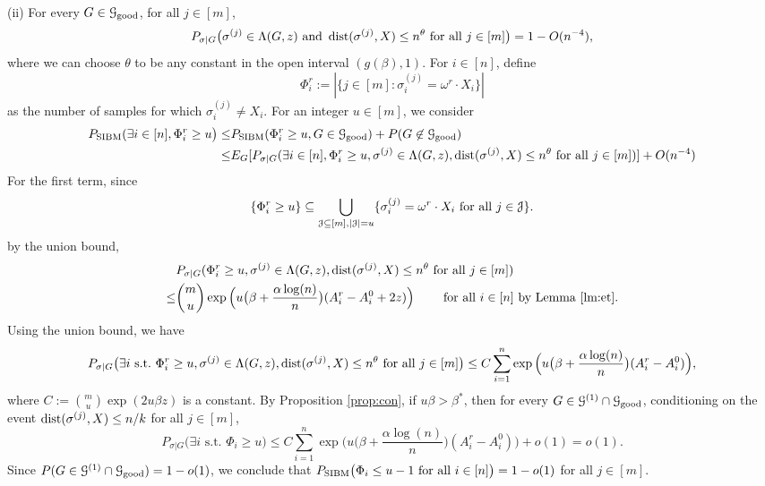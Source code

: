 \documentclass{article}
\begin{document}
\noindent (ii) For every $G\in\mathcal{G}_{\operatorname{good}}$, for all $j\in[m]$,
\begin{equation}  \label{eq:chui}
P_{\sigma|G} \big( \sigma^{(j)}\in  \Lambda(G, z)
\text{~and~} \operatorname{dist}(\sigma^{(j)}, X) \le n^\theta
\text{~for all~} j\in[m]  \big)
=1- O(n^{-4}) ,
\end{equation}
where we can choose $\theta$ to be any constant in the open interval $(g(\beta), 1)$.
For $i\in[n]$, define 
$$
\Phi^r_i := |\{j\in[m]: \sigma_i^{(j)} = \omega^r \cdot X_i\}|
$$
as the number of samples for which $\sigma_i^{(j)} \neq X_i$.
For an integer $u\in[m]$, we consider
\begin{align*}
P_{\operatorname{SIBM}}( \exists i \in [n], \Phi^r_i \ge u \big) \leq &P_{\operatorname{SIBM}}( \Phi^r_i \ge u , G \in \mathcal{G}_{\operatorname{good}}) + P(G \not\in \mathcal{G}_{\operatorname{good}}) \\
\leq & E_G[P_{\sigma |G}(\exists i \in [n], \Phi^r_i \ge u, \sigma^{(j)}\in \Lambda(G,z) ,\operatorname{dist}(\sigma^{(j)}, X) \le n^{\theta} \text{~for all~} j\in[m])]+ O(n^{-4})
\end{align*}
For the first term, since
$$
\{\Phi^r_i \ge u\} \subseteq
\bigcup_{\mathcal{J}\subseteq[m], |\mathcal{J}|=u}
\{\sigma_i^{(j)} = \omega^r \cdot X_i \text{~for all~} j\in \mathcal{J}\} .
$$
by the union bound,
\begin{align*}
& P_{\sigma|G}( \Phi^r_i \ge u, \sigma^{(j)}\in \Lambda(G,z) ,\operatorname{dist}(\sigma^{(j)}, X) \le n^{\theta} \text{~for all~} j\in[m] ) \\
\le &  \binom{m}{u} \exp\Big(u\big(\beta+\frac{\alpha\log(n)}{n} \big) (A^r_i-A^0_i + 2z) \Big)
\quad\quad\text{~for all~} i\in[n] \textrm{ by Lemma~\ref{lm:et}}.
\end{align*}
Using the union bound, we have
$$
P_{\sigma|G} \big(\exists i \text{~s.t.~} \Phi^r_i \ge u, \sigma^{(j)}\in \Lambda(G,z) ,\operatorname{dist}(\sigma^{(j)}, X) \le n^{\theta} \text{~for all~} j\in[m] \big) \le 
C  \sum_{i=1}^n \exp\Big(u \big(\beta+\frac{\alpha\log(n)}{n} \big) (A^r_i-A^0_i ) \Big),
$$
where $C:=\binom{m}{u}\exp(2u\beta z)$ is a constant.
By Proposition \ref{prop:con}, if $u\beta>\beta^*$, then for every $G\in\mathcal{G}^{(1)}\cap\mathcal{G}_{\operatorname{good}}$, conditioning on the event $\operatorname{dist}(\sigma^{(j)}, X) \le n/k$ for all $j\in[m]$,
$$
P_{\sigma|G} \big(\exists i \text{~s.t.~} \Phi_i \ge u \big) \le 
C\sum_{i=1}^n \exp\Big(u \big(\beta+\frac{\alpha\log(n)}{n} \big) (A^r_i-A^0_i ) \Big) + o(1) =o(1).
$$
Since $P(G\in\mathcal{G}^{(1)}\cap\mathcal{G}_{\operatorname{good}})=1-o(1)$, we conclude that $P_{\operatorname{SIBM}} \big(\Phi_i \le u-1 \text{~for all~} i\in[n] \big)=1-o(1)$ for all $j\in[m]$.
\end{document}
